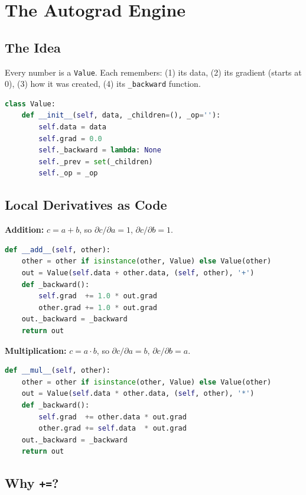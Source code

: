 \documentclass[11pt,a4paper]{book}
\begin{document}
\chapter{The Autograd Engine}\label{ch:autograd}

\section{The Idea}

Every number is a \texttt{Value}. Each remembers: (1) its data, (2) its gradient (starts at 0), (3) how it was created, (4) its \texttt{\_backward} function.

\begin{lstlisting}[language=Python, frame=single, caption={The Value class skeleton}]
class Value:
    def __init__(self, data, _children=(), _op=''):
        self.data = data
        self.grad = 0.0
        self._backward = lambda: None
        self._prev = set(_children)
        self._op = _op
\end{lstlisting}

\section{Local Derivatives as Code}

\textbf{Addition:} $c = a + b$, so $\partial c/\partial a = 1$, $\partial c/\partial b = 1$.
\begin{lstlisting}[language=Python, frame=single]
def __add__(self, other):
    other = other if isinstance(other, Value) else Value(other)
    out = Value(self.data + other.data, (self, other), '+')
    def _backward():
        self.grad  += 1.0 * out.grad
        other.grad += 1.0 * out.grad
    out._backward = _backward
    return out
\end{lstlisting}

\textbf{Multiplication:} $c = a \cdot b$, so $\partial c/\partial a = b$, $\partial c/\partial b = a$.
\begin{lstlisting}[language=Python, frame=single]
def __mul__(self, other):
    other = other if isinstance(other, Value) else Value(other)
    out = Value(self.data * other.data, (self, other), '*')
    def _backward():
        self.grad  += other.data * out.grad
        other.grad += self.data  * out.grad
    out._backward = _backward
    return out
\end{lstlisting}

\section{Why \texttt{+=}?}
\end{document}
